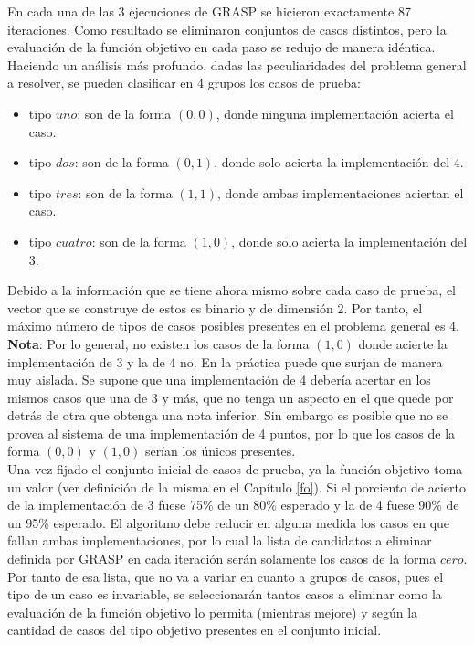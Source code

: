 \documentclass[a4paper,openright,11pt,oneside]{book}
\begin{document}
	En cada una de las 3 ejecuciones de GRASP se hicieron exactamente 87 iteraciones. Como resultado se eliminaron conjuntos de casos distintos, pero la evaluación de la función objetivo en cada paso se redujo de manera idéntica. \\
	
	Haciendo un análisis más profundo, dadas las peculiaridades del problema general a resolver, se pueden clasificar en 4 grupos los casos de prueba:
	
	\begin{itemize}
		\item tipo $uno$: son de la forma $(0, 0)$, donde ninguna implementación acierta el caso.
		\item tipo $dos$: son de la forma $(0, 1)$, donde solo acierta la implementación del 4.
		\item tipo $tres$: son de la forma $(1, 1)$, donde ambas implementaciones aciertan el caso.
		\item tipo $cuatro$: son de la forma $(1, 0)$, donde solo acierta la implementación del 3.
	\end{itemize}

	Debido a la información que se tiene ahora mismo sobre cada caso de prueba, el vector que se construye de estos es binario y de dimensión 2. Por tanto, el máximo número de tipos de casos posibles presentes en el problema general es 4.\\

	\textbf{Nota}: Por lo general, no existen los casos de la forma $(1, 0)$ donde acierte la implementación de 3 y la de 4 no. En la práctica puede que surjan de manera muy aislada. Se supone que una implementación de 4 debería acertar en los mismos casos que una de 3 y más, que no tenga un aspecto en el que quede por detrás de otra que obtenga una nota inferior. Sin embargo es posible que no se provea al sistema de una implementación de 4 puntos, por lo que los casos de la forma $(0, 0)$ y $(1, 0)$  serían los únicos presentes.\\
 
 	Una vez fijado el conjunto inicial de casos de prueba, ya la función objetivo toma un valor (ver definición de la misma en el Capítulo \ref{fo}). Si el porciento de acierto de la implementación de 3 fuese 75\% de un 80\% esperado y la de 4 fuese 90\% de un 95\% esperado. El algoritmo debe reducir en alguna medida los casos en que fallan ambas implementaciones, por lo cual la lista de candidatos a eliminar definida por GRASP en cada iteración serán solamente los casos de la forma $cero$. Por tanto de esa lista, que no va a variar en cuanto a grupos de casos, pues el tipo de un caso es invariable, se seleccionarán tantos casos a eliminar como la evaluación de la función objetivo lo permita (mientras mejore) y según la cantidad de casos del tipo objetivo presentes en el conjunto inicial.
 	
\end{document}
